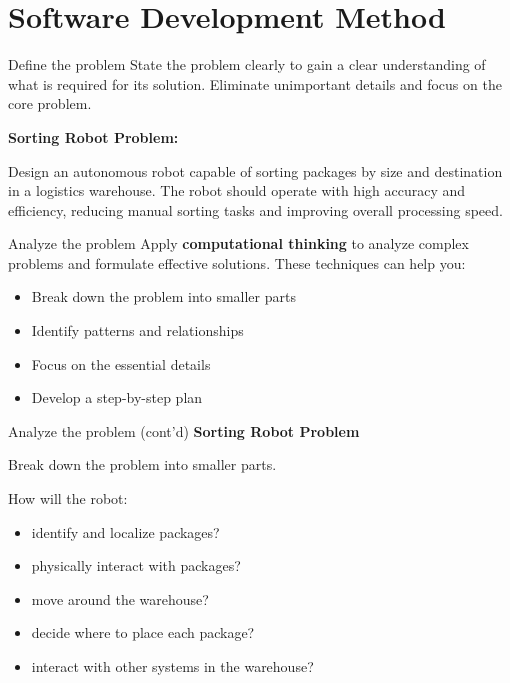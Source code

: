 \documentclass[sectionframe]{oxblue-beamer}
\begin{document}
\section{Software Development Method}

\begin{frame}{Define the problem}
State the problem clearly to gain a clear understanding of what is required for its solution. Eliminate unimportant details and focus on the core problem.

\par\bigskip \textbf{Sorting Robot Problem:}

Design an autonomous robot capable of sorting packages by size and destination in a logistics warehouse. The robot should operate with high accuracy and efficiency, reducing manual sorting tasks and improving overall processing speed.
\end{frame}

\begin{frame}{Analyze the problem}
Apply \textbf{computational thinking} to analyze complex problems and formulate effective solutions. These techniques can help you:

\begin{itemize}
    \item Break down the problem into smaller parts
    \item Identify patterns and relationships
    \item Focus on the essential details
    \item Develop a step-by-step plan
\end{itemize}
\end{frame}

\begin{frame}{Analyze the problem (cont'd)}
\textbf{Sorting Robot Problem}

\par\bigskip Break down the problem into smaller parts.

\par\bigskip How will the robot:
\begin{itemize}
    \item identify and localize packages?
    \item physically interact with packages?
    \item move around the warehouse?
    \item decide where to place each package?
    \item interact with other systems in the warehouse?
\end{itemize}
\end{frame}
\end{document}
